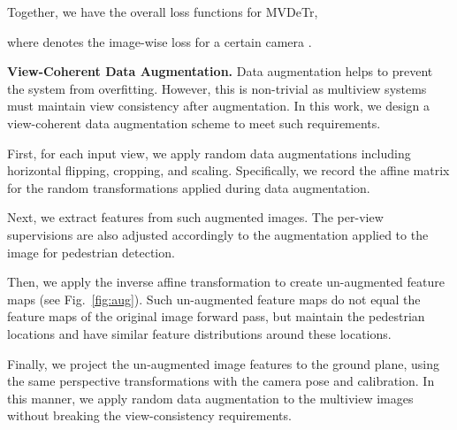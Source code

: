 \documentclass[sigconf,authorversion,nonacm]{acmart}
\begin{document}
Together, we have the overall loss functions for MVDeTr,

where  denotes the image-wise loss for a certain camera . 



\textbf{View-Coherent Data Augmentation.}
Data augmentation helps to prevent the system from overfitting. However, this is non-trivial as multiview systems must maintain view consistency after augmentation. In this work, we design a view-coherent data augmentation scheme to meet such requirements. 

First, for each input view, we apply random data augmentations including horizontal flipping, cropping, and scaling. Specifically, we record the affine matrix for the random transformations applied during data augmentation. 

Next, we extract features from such augmented images. The per-view supervisions are also adjusted accordingly to the augmentation applied to the image for pedestrian detection. 


Then, we apply the inverse affine transformation to create un-augmented feature maps (see Fig.~\ref{fig:aug}). Such un-augmented feature maps do not equal the feature maps of the original image forward pass, but maintain the pedestrian locations and have similar feature distributions around these locations. 

Finally, we project the un-augmented image features to the ground plane, using the same perspective transformations with the camera pose and calibration. In this manner, we apply random data augmentation to the multiview images without breaking the view-consistency requirements. 
\end{document}
